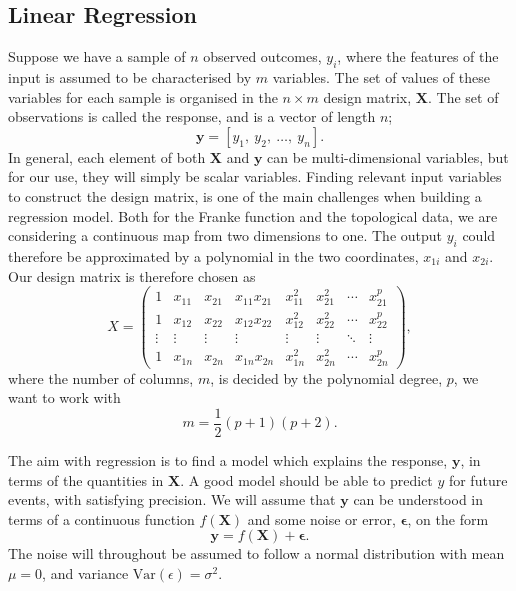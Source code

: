\documentclass[a4paper, 
amsfonts, 
amssymb, 
amsmath, 
reprint, 
showkeys, 
nofootinbib, 
twoside]{revtex4-2}
\begin{document}
\subsection{Linear Regression}
Suppose we have a sample of $n$ observed outcomes, $y_i$, where the features of the input is assumed to be characterised by $m$ variables. The set of values of these variables for each sample is organised in the $n\times m$ design matrix, $\bm{X}$. The set of observations is called the response, and is a vector of length $n$;
\begin{equation}
    \bm{y} = [y_1, \: y_2,\: \dots, \: y_n].
\end{equation}
In general, each element of both $\bm{X}$ and $\bm{y}$ can be multi-dimensional variables, but for our use, they will simply be scalar variables. Finding relevant input variables to construct the design matrix, is one of the main challenges when building a regression model. Both for the Franke function and the topological data, we are considering a continuous map from two dimensions to one. The output $y_i$ could therefore be approximated by a polynomial in the two coordinates, $x_{1i}$ and $x_{2i}$. Our design matrix is therefore chosen as
\begin{equation}
    X = \begin{pmatrix} 
            1 & x_{11} & x_{21} & x_{11}x_{21} & x_{11}^2 & x_{21}^2 & \cdots & x_{21}^p\\ 
            1 & x_{12} & x_{22} & x_{12}x_{22} & x_{12}^2 & x_{22}^2 & \cdots & x_{22}^p\\
            \vdots & \vdots & \vdots & \vdots & \vdots & \vdots &  \ddots & \vdots \\
            1 & x_{1n} & x_{2n} & x_{1n}x_{2n} & x_{1n}^2 & x_{2n}^2 & \cdots & x_{2n}^p
        \end{pmatrix},
\end{equation}
where the number of columns, $m$, is decided by the polynomial degree, $p$, we want to work with
\begin{equation}
    m = \frac{1}{2}(p+1)(p+2).
\end{equation}

The aim with regression is to find a model which explains the response, $\bm{y}$, in terms of the quantities in $\bm{X}$. A good model should be able to predict $y$ for future events, with satisfying precision. We will assume that $\bm{y}$ can be understood in terms of a continuous function $f(\bm{X})$ and some noise or error, $\bm{\epsilon}$, on the form
\begin{equation}
    \bm{y} = f(\bm{X}) + \bm{\epsilon}.
    \label{eq:y_f}
\end{equation}
The noise will throughout be assumed to follow a normal distribution with mean $\mu = 0$, and variance $\mathrm{Var}(\epsilon) = \sigma^2$.
\end{document}
